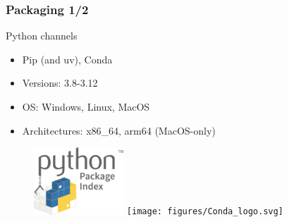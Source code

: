 \documentclass[aspectratio=169]{beamer}
\begin{document}

\begin{frame}
\frametitle{Packaging 1/2}
\begin{block}{Python channels}
\begin{itemize}
\item Pip (and uv), Conda
\item Versions: 3.8-3.12
\item OS: Windows, Linux, MacOS
\item Architectures: x86\_64, arm64 (MacOS-only)
\end{itemize}
\end{block}

\begin{figure}
   \includegraphics[width=0.3\textwidth]{figures/PyPI_logo}
   \texttt{[image: figures/Conda\_logo.svg]}
\end{figure}

\end{frame}
\end{document}
